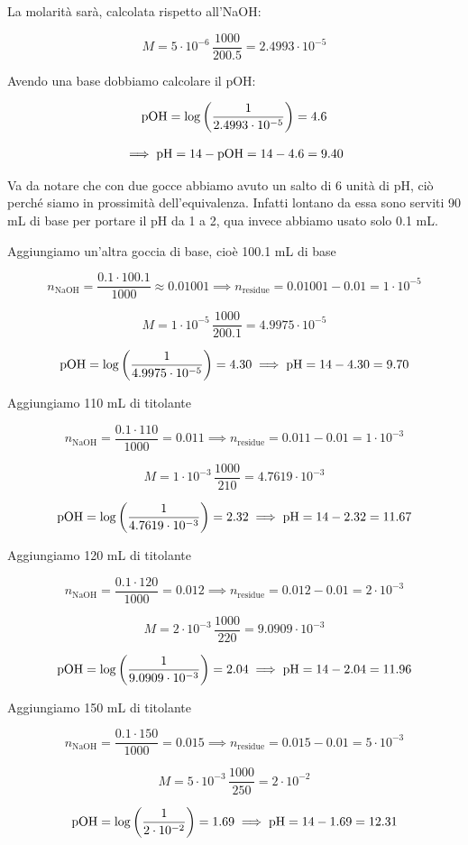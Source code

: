 La molarità sarà, calcolata rispetto all'NaOH:

$$M=5 \cdot 10^{-6} \, \frac{1000}{200.5}=2.4993 \cdot 10^{-5}$$

Avendo una base dobbiamo calcolare il pOH:

$$\rm pOH = \log \left( \frac{1}{2.4993 \cdot 10^{-5}} \right)=4.6$$

$$\implies \rm pH=14 - pOH=14-4.6=9.40$$

Va da notare che con due gocce abbiamo avuto un salto di 6 unità di pH, ciò perché siamo in prossimità dell'equivalenza. Infatti lontano da essa sono serviti 90 mL di base per portare il pH da 1 a 2, qua invece abbiamo usato solo 0.1 mL.

Aggiungiamo un'altra goccia di base, cioè 100.1 mL di base

$$n_{\text{NaOH}}=\frac{0.1 \cdot 100.1}{1000}\approx 0.01001\implies n_{\text{residue}}=0.01001-0.01 = 1 \cdot 10^{-5}$$

$$M=1 \cdot 10^{-5} \, \frac{1000}{200.1}=4.9975 \cdot 10^{-5}$$

$$\rm pOH=\log \left( \frac{1}{4.9975 \cdot 10^{-5}} \right)=4.30 \implies \rm pH=14-4.30=9.70$$

Aggiungiamo 110 mL di titolante

$$n_{\text{NaOH}}=\frac{0.1 \cdot 110}{1000}= 0.011\implies n_{\text{residue}}=0.011-0.01 = 1 \cdot 10^{-3}$$

$$M=1 \cdot 10^{-3} \, \frac{1000}{210}=4.7619 \cdot 10^{-3}$$

$$\rm pOH=\log \left( \frac{1}{4.7619 \cdot 10^{-3}} \right)=2.32 \implies \rm pH=14-2.32=11.67$$

Aggiungiamo 120 mL di titolante

$$n_{\text{NaOH}}=\frac{0.1 \cdot 120}{1000}= 0.012\implies n_{\text{residue}}=0.012-0.01 = 2 \cdot 10^{-3}$$

$$M=2 \cdot 10^{-3} \, \frac{1000}{220}=9.0909 \cdot 10^{-3}$$

$$\rm pOH=\log \left( \frac{1}{9.0909 \cdot 10^{-3}} \right)=2.04 \implies \rm pH=14-2.04=11.96$$

Aggiungiamo 150 mL di titolante

$$n_{\text{NaOH}}=\frac{0.1 \cdot 150}{1000}= 0.015\implies n_{\text{residue}}=0.015-0.01 = 5 \cdot 10^{-3}$$

$$M=5 \cdot 10^{-3} \, \frac{1000}{250}=2 \cdot 10^{-2}$$

$$\rm pOH=\log \left( \frac{1}{2 \cdot 10^{-2}} \right)=1.69 \implies \rm pH=14-1.69=12.31$$

